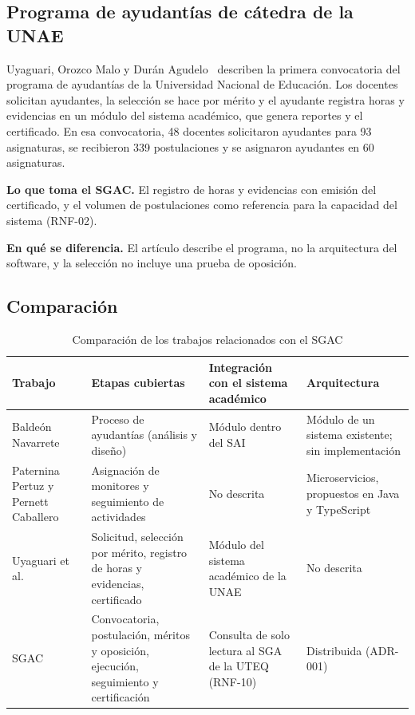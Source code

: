 \subsection{Programa de ayudantías de cátedra de la UNAE}

Uyaguari, Orozco Malo y Durán Agudelo~\cite{uyaguari2022unae} describen la primera convocatoria del programa de ayudantías de la Universidad Nacional de Educación. Los docentes solicitan ayudantes, la selección se hace por mérito y el ayudante registra horas y evidencias en un módulo del sistema académico, que genera reportes y el certificado. En esa convocatoria, 48 docentes solicitaron ayudantes para 93 asignaturas, se recibieron 339 postulaciones y se asignaron ayudantes en 60 asignaturas.

\textbf{Lo que toma el SGAC.} El registro de horas y evidencias con emisión del certificado, y el volumen de postulaciones como referencia para la capacidad del sistema (RNF-02).

\textbf{En qué se diferencia.} El artículo describe el programa, no la arquitectura del software, y la selección no incluye una prueba de oposición.

\subsection{Comparación}

\begin{table}[htbp]
  \centering
  \caption{Comparación de los trabajos relacionados con el SGAC}
  \label{tab:trabajos-relacionados}
  \small
  \begin{tabularx}{\textwidth}{@{}>{\raggedright\arraybackslash}p{2.4cm}
                                  >{\raggedright\arraybackslash}X
                                  >{\raggedright\arraybackslash}X
                                  >{\raggedright\arraybackslash}X@{}}
    \toprule
    \textbf{Trabajo} & \textbf{Etapas cubiertas} & \textbf{Integración con el sistema académico} & \textbf{Arquitectura} \\
    \midrule
    Baldeón Navarrete~\cite{baldeon2022sai}
      & Proceso de ayudantías (análisis y diseño)
      & Módulo dentro del SAI
      & Módulo de un sistema existente; sin implementación \\
    Paternina Pertuz y Pernett Caballero~\cite{paternina2024monitores}
      & Asignación de monitores y seguimiento de actividades
      & No descrita
      & Microservicios, propuestos en Java y TypeScript \\
    Uyaguari et al.~\cite{uyaguari2022unae}
      & Solicitud, selección por mérito, registro de horas y evidencias, certificado
      & Módulo del sistema académico de la UNAE
      & No descrita \\
    \midrule
    SGAC
      & Convocatoria, postulación, méritos y oposición, ejecución, seguimiento y certificación
      & Consulta de solo lectura al SGA de la UTEQ (RNF-10)
      & Distribuida (ADR-001) \\
    \bottomrule
  \end{tabularx}
\end{table}
